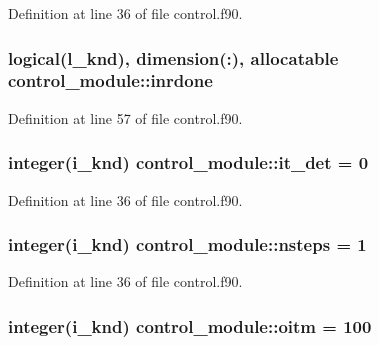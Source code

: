 Definition at line 36 of file control.\-f90.

\hypertarget{classcontrol__module_a800d3f9715c61376ad1a2d5b5b77e116}{
\subsubsection[{inrdone}]{\setlength{\rightskip}{0pt plus 5cm}logical(l\-\_\-knd), dimension(\-:), allocatable control\-\_\-module\-::inrdone}}\label{classcontrol__module_a800d3f9715c61376ad1a2d5b5b77e116}


Definition at line 57 of file control.\-f90.

\hypertarget{classcontrol__module_a47222ebdff0b8cbd932da30c43572177}{
\subsubsection[{it\-\_\-det}]{\setlength{\rightskip}{0pt plus 5cm}integer(i\-\_\-knd) control\-\_\-module\-::it\-\_\-det = 0}}\label{classcontrol__module_a47222ebdff0b8cbd932da30c43572177}


Definition at line 36 of file control.\-f90.

\hypertarget{classcontrol__module_a94e5569686ecc448c8fb807946cf95fb}{
\subsubsection[{nsteps}]{\setlength{\rightskip}{0pt plus 5cm}integer(i\-\_\-knd) control\-\_\-module\-::nsteps = 1}}\label{classcontrol__module_a94e5569686ecc448c8fb807946cf95fb}


Definition at line 36 of file control.\-f90.

\hypertarget{classcontrol__module_a99fddac51dc4299027ab5afd97c5c7ea}{
\subsubsection[{oitm}]{\setlength{\rightskip}{0pt plus 5cm}integer(i\-\_\-knd) control\-\_\-module\-::oitm = 100}}\label{classcontrol__module_a99fddac51dc4299027ab5afd97c5c7ea}



